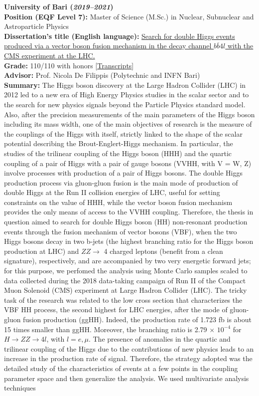 \documentclass[11pt]{res}
\begin{document}
\begin{resume}
\textbf{University of Bari (\textit{2019--2021})}\\
\textbf{Position (EQF Level 7):} Master of Science (M.Sc.) in Nuclear, Subnuclear and Astroparticle Physics\\
\textbf{Dissertation's title (English language):}
\href{https://inspirehep.net/literature/1955669}{Search for double Higgs events produced via a vector boson fusion mechanism in the decay channel $b\overline{b}4l$ with the CMS experiment at the LHC.}\\
\textbf{Grade:} 110/110 with honors [\href{https://drive.google.com/file/d/1V2sxudg9bGwW-S0WduNndtO60tdJLPUf/view?usp=sharing}{Transcripts}]\\
\textbf{Advisor:} Prof. Nicola De Filippis (Polytechnic and INFN Bari)\\
\textbf{Summary:} The Higgs boson discovery at the Large Hadron Collider (LHC) in 2012 led to a new era of High Energy Physics studies in the scalar sector and to the search for new physics signals beyond the Particle Physics standard model. Also, after the precision measurements of the main parameters of the Higgs boson including its mass width, one of the main objectives of research is the measure of the couplings of the Higgs with itself, strictly linked to the shape of the scalar potential describing the Brout-Englert-Higgs mechanism. In particular, the studies of the trilinear coupling of the Higgs boson (HHH) and the quartic coupling of a pair of Higgs with a pair of gauge bosons (VVHH, with V = W, Z) involve processes with production of a pair of Higgs bosons. The double Higgs production process via gluon-gluon fusion is the main mode of production of double Higgs at the Run II collision energies of LHC, useful for setting constraints on the value of HHH, while the vector boson fusion mechanism provides the only means of access to the VVHH coupling. Therefore, the thesis in question aimed to search for double Higgs boson (HH) non-resonant production events through the fusion mechanism of vector bosons (VBF), when the two Higgs bosons decay in two b-jets (the highest branching ratio for the Higgs boson production at LHC) and $ZZ \to$ 4 charged leptons (benefit from a clean signature), respectively, and are accompanied by two very energetic forward jets; for this purpose, we perfomed the analysis using Monte Carlo samples scaled to data collected during the 2018 data-taking campaign of Run II of the Compact Muon Solenoid (CMS) experiment at Large Hadron Collider (LHC). The tricky task of the research was related to the low cross section that characterizes the VBF HH process, the second highest for LHC energies, after the mode of gluon-gluon fusion production (ggHH). Indeed, the production rate of 1.723 fb is about 15 times smaller than ggHH. Moreover, the branching ratio is 2.79 $\times$ $10^{-4}$ for $H\to ZZ\to 4l$, with $l = e, \mu$. The presence of anomalies in the quartic and trilinear coupling of the Higgs due to the contributions of new physics leads to an increase in the production rate of signal. Therefore, the strategy adopted was the detailed study of the characteristics of events at a few points in the coupling parameter space and then generalize the analysis. We used multivariate analysis techniques 
\end{resume}
\end{document}
